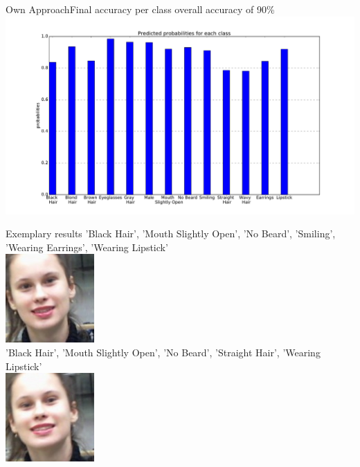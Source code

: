\documentclass{beamer}
\begin{document}
\begin{frame}{Own Approach}{Final accuracy per class}
\centering
overall accuracy of 90\%
	\includegraphics[width=1.1\textwidth]{figures/accuracy_on_classes} 
\end{frame}

\begin{frame}{Exemplary results}
\centering
'Black Hair', 'Mouth Slightly Open', 'No Beard', 'Smiling', 'Wearing Earrings', 'Wearing Lipstick' \\
\includegraphics[height=0.3\textheight]{figures/leti_normalised110} \\ 
'Black Hair', 'Mouth Slightly Open', 'No Beard', 'Straight Hair', 'Wearing Lipstick' \\
\includegraphics[height=0.3\textheight]{figures/leti_normalised111} 
\end{frame}
\end{document}
